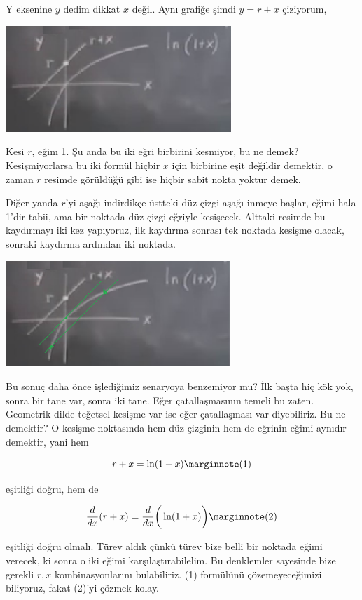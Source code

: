 \documentclass[12pt,fleqn]{article}\usepackage{../../common}
\begin{document}
Y eksenine $y$ dedim dikkat $\dot{x}$ değil. Aynı grafiğe şimdi $y = r + x$
çiziyorum,

\includegraphics[height=4cm]{02_16.png}

Kesi $r$, eğim 1. Şu anda bu iki eğri birbirini kesmiyor, bu ne demek?
Kesişmiyorlarsa bu iki formül hiçbir $x$ için birbirine eşit değildir demektir,
o zaman $r$ resimde görüldüğü gibi ise hiçbir sabit nokta yoktur demek.

Diğer yanda $r$'yi aşağı indirdikçe üstteki düz çizgi aşağı inmeye başlar, eğimi
hala 1'dir tabii, ama bir noktada düz çizgi eğriyle kesişecek. Alttaki resimde
bu kaydırmayı iki kez yapıyoruz, ilk kaydırma sonrası tek noktada kesişme
olacak, sonraki kaydırma ardından iki noktada.

\includegraphics[height=4cm]{02_17.png}

Bu sonuç daha önce işlediğimiz senaryoya benzemiyor mu? İlk başta hiç kök yok,
sonra bir tane var, sonra iki tane. Eğer çatallaşmasının temeli bu
zaten. Geometrik dilde teğetsel kesişme var ise eğer çatallaşması var
diyebiliriz. Bu ne demektir? O kesişme noktasında hem düz çizginin hem de
eğrinin eğimi aynıdır demektir, yani hem

$$ r + x = \ln(1+x) 
\mlabel{1} $$

eşitliği doğru, hem de

$$
\frac{d}{dx} (r + x) = \frac{d}{dx} \bigg( \ln (1+x) \bigg)
\mlabel{2}
$$

eşitliği doğru olmalı. Türev aldık çünkü türev bize belli bir noktada eğimi
verecek, ki sonra o iki eğimi karşılaştırabilelim. Bu denklemler sayesinde bize
gerekli $r,x$ kombinasyonlarını bulabiliriz. (1) formülünü çözemeyeceğimizi
biliyoruz, fakat (2)'yi çözmek kolay.
\end{document}
